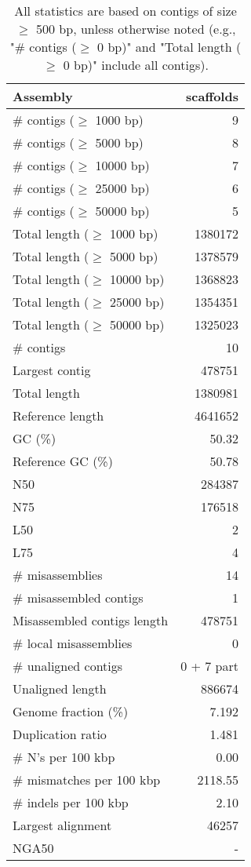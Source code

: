 \documentclass[12pt,a4paper]{article}
\begin{document}
\begin{table}[ht]
\begin{center}
\caption{All statistics are based on contigs of size $\geq$ 500 bp, unless otherwise noted (e.g., "\# contigs ($\geq$ 0 bp)" and "Total length ($\geq$ 0 bp)" include all contigs).}
\begin{tabular}{|l*{1}{|r}|}
\hline
Assembly & scaffolds \\ \hline
\# contigs ($\geq$ 1000 bp) & 9 \\ \hline
\# contigs ($\geq$ 5000 bp) & 8 \\ \hline
\# contigs ($\geq$ 10000 bp) & 7 \\ \hline
\# contigs ($\geq$ 25000 bp) & 6 \\ \hline
\# contigs ($\geq$ 50000 bp) & 5 \\ \hline
Total length ($\geq$ 1000 bp) & 1380172 \\ \hline
Total length ($\geq$ 5000 bp) & 1378579 \\ \hline
Total length ($\geq$ 10000 bp) & 1368823 \\ \hline
Total length ($\geq$ 25000 bp) & 1354351 \\ \hline
Total length ($\geq$ 50000 bp) & 1325023 \\ \hline
\# contigs & 10 \\ \hline
Largest contig & 478751 \\ \hline
Total length & 1380981 \\ \hline
Reference length & 4641652 \\ \hline
GC (\%) & 50.32 \\ \hline
Reference GC (\%) & 50.78 \\ \hline
N50 & 284387 \\ \hline
N75 & 176518 \\ \hline
L50 & 2 \\ \hline
L75 & 4 \\ \hline
\# misassemblies & 14 \\ \hline
\# misassembled contigs & 1 \\ \hline
Misassembled contigs length & 478751 \\ \hline
\# local misassemblies & 0 \\ \hline
\# unaligned contigs & 0 + 7 part \\ \hline
Unaligned length & 886674 \\ \hline
Genome fraction (\%) & 7.192 \\ \hline
Duplication ratio & 1.481 \\ \hline
\# N's per 100 kbp & 0.00 \\ \hline
\# mismatches per 100 kbp & 2118.55 \\ \hline
\# indels per 100 kbp & 2.10 \\ \hline
Largest alignment & 46257 \\ \hline
NGA50 & - \\ \hline
\end{tabular}
\end{center}
\end{table}
\end{document}
